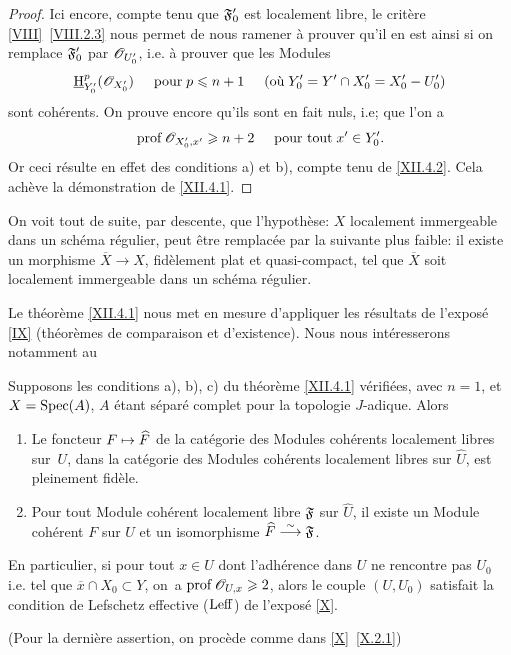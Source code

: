 \begin{proof}
\enlargethispage{\baselineskip}%
Ici encore, compte tenu que $\mathfrak{F}_0'$ est localement libre, le crit\`ere \ref{VIII}~\ref{VIII.2.3} nous permet de nous ramener \`a prouver qu'il en est ainsi si on remplace $\mathfrak{F}_0'$ par ${\mathscr O}_{U'_0}$, i.e. \`a prouver que les Modules
\[
\mathop{\underline{\mathrm{H}}}\nolimits^p_{Y_0'}({\mathscr O}_{X_0'}) \hspace{5mm} \text{pour} \; p\leqslant n+1 \hspace{5mm} \text{(où} \; Y'_0=Y'\cap X_0'=X_0'- U'_0 \text{)}
\]
sont coh\'erents. On prouve encore qu'ils sont en fait nuls, i.e; que l'on a
\steco
\begin{equation} \label{eq:XII.25} {}\operatorname{prof} {\mathscr O}_{X'_0, x'} \geqslant n+2 \hspace{5mm} \text{pour tout} \; x'\in Y'_0.
\end{equation}
Or ceci r\'esulte en effet des conditions a) et b), compte tenu de \ref{XII.4.2}. Cela ach\`eve la d\'emonstration de \ref{XII.4.1}.
\skipqed
\end{proof}

\begin{remarque} \label{XII.4.3}
On voit tout de suite, par descente, que l'hypoth\`ese: $X$ localement immergeable dans un sch\'ema r\'egulier, peut \^etre remplac\'ee par la suivante plus faible: il existe un morphisme $\overline{X}\to X$, fid\`element plat et quasi-compact, tel que $\overline{X}$ soit localement immergeable dans un sch\'ema r\'egulier.
\end{remarque}

Le th\'eor\`eme \ref{XII.4.1} nous met en mesure d'appliquer les r\'esultats de l'expos\'e \ref{IX} (th\'eor\`emes de comparaison et d'existence). Nous nous int\'eresserons notamment au

\begin{corollaire} \label{XII.4.4}
Supposons les conditions a), b), c) du th\'eor\`eme \ref{XII.4.1} v\'erifi\'ees, avec $n=1$, et $X=\operatorname{Spec}(A)$, $A$ \'etant s\'epar\'e complet pour la topologie $J$-adique. Alors
\begin{enumerate}
\item[\textup{1\noo})] Le foncteur $F\mto \widehat{F}$ de la cat\'egorie des Modules coh\'erents localement libres sur~$U$, dans la cat\'egorie des Modules coh\'erents localement libres sur $\widehat{U}$, est pleinement fid\`ele. \item[\textup{2\noo})] Pour tout Module coh\'erent localement libre $\mathfrak{F}$ sur $\widehat{U}$, il existe un Module coh\'erent $F$ sur $U$ et un isomorphisme $\widehat{F}\overset{\sim}{\longrightarrow} \mathfrak{F}$.
\end{enumerate}
En particulier, si pour tout $x\in U$ dont l'adh\'erence dans $U$ ne rencontre pas $U_0$ i.e. tel que $\overline{x}\cap X_0\subset Y$, on~a $\operatorname{prof} {\mathscr O}_{U, x}\geqslant 2$, alors le couple $(U, U_0)$ satisfait la condition de Lefschetz effective ($\operatorname{Leff}$) de l'expos\'e \ref{X}.
\end{corollaire}
\noindent
(Pour la derni\`ere assertion, on proc\`ede comme dans \ref{X}~\ref{X.2.1})

